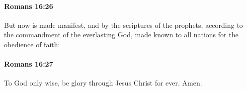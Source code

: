 		\paragraph{Romans 16:26} %
			\label{ROMANS-16-26}

			But now is made manifest, and by the scriptures of the prophets, according to the commandment of the everlasting God, made known to all nations for the obedience of faith:

			\begin{framed}
			\scriptsize
				\begin{compactdesc}
					\item[SBLG] \gr{---}
				\end{compactdesc}
			\end{framed}

		\paragraph{Romans 16:27} %
			\label{ROMANS-16-27}

			To God only wise, be glory through Jesus Christ for ever. Amen.

			\begin{framed}
			\scriptsize
				\begin{compactdesc}
					\item[SBLG] \gr{---}
				\end{compactdesc}
			\end{framed}